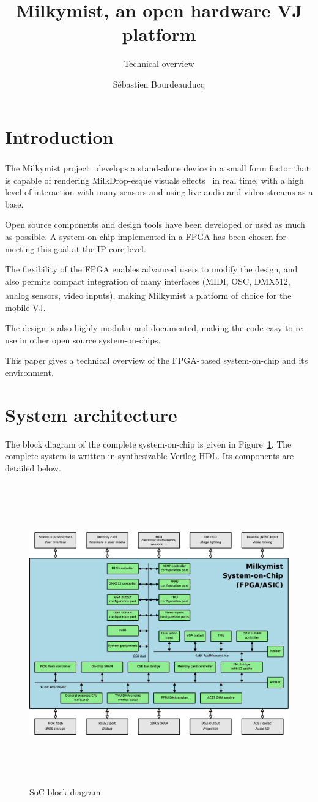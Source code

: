 \documentclass[a4paper,11pt,twocolumn]{paper}
\title{Milkymist, an open hardware VJ platform}
\subtitle{Technical overview}
\author{S\'ebastien Bourdeauducq}
\begin{document}
\maketitle{}
\section{Introduction}
The Milkymist\textsuperscript{\texttrademark} project~\cite{milkymist} develops a stand-alone device in a small form factor that is capable of rendering MilkDrop-esque visuals effects~\cite{milkdrop} in real time, with a high level of interaction with many sensors and using live audio and video streams as a base.

Open source components and design tools have been developed or used as much as possible. A system-on-chip implemented in a FPGA has been chosen for meeting this goal at the IP core level.

The flexibility of the FPGA enables advanced users to modify the design, and also permits compact integration of many interfaces (MIDI, OSC, DMX512, analog sensors, video inputs), making Milkymist\textsuperscript{\texttrademark} a platform of choice for the mobile VJ.

The design is also highly modular and documented, making the code easy to re-use in other open source system-on-chips.

This paper gives a technical overview of the FPGA-based system-on-chip and its environment.

\section{System architecture}
The block diagram of the complete system-on-chip is given in Figure~\ref{fig:block}. The complete system is written in synthesizable Verilog HDL. Its components are detailed below.
\begin{figure}
\centering
\includegraphics[height=130mm]{soc_architecture.eps}
\caption{SoC block diagram}
\label{fig:block}
\end{figure}
\end{document}
